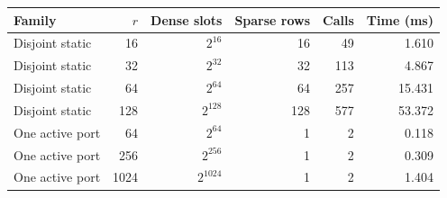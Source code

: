 \begin{tabular}{@{}lrrrrr@{}}
\toprule
Family & $r$ & Dense slots & Sparse rows & Calls & Time (ms)\\
\midrule
Disjoint static & 16 & $2^{16}$ & 16 & 49 & 1.610\\
Disjoint static & 32 & $2^{32}$ & 32 & 113 & 4.867\\
Disjoint static & 64 & $2^{64}$ & 64 & 257 & 15.431\\
Disjoint static & 128 & $2^{128}$ & 128 & 577 & 53.372\\
One active port & 64 & $2^{64}$ & 1 & 2 & 0.118\\
One active port & 256 & $2^{256}$ & 1 & 2 & 0.309\\
One active port & 1024 & $2^{1024}$ & 1 & 2 & 1.404\\
\bottomrule
\end{tabular}
